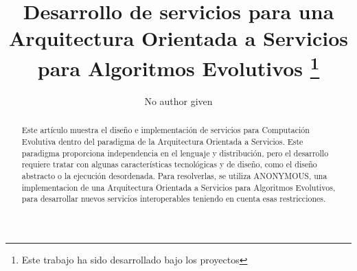 \documentclass[runningheads]{llncs}
\begin{document}
\mainmatter  %



\title{Desarrollo de servicios para una Arquitectura Orientada a Servicios para Algoritmos Evolutivos \thanks{Este trabajo ha sido desarrollado bajo los proyectos 
}}

\author{No author given}

%







\maketitle
\begin{abstract}
Este artículo muestra el diseño e implementación de servicios para
Computación Evolutiva dentro del paradigma de la Arquitectura
Orientada a Servicios. Este paradigma proporciona independencia en el
lenguaje y distribución, pero el desarrollo requiere tratar con
algunas características tecnológicas y de diseño, como el diseño
abstracto o la ejecución desordenada. Para resolverlas, se utiliza
ANONYMOUS, una implementacion de una Arquitectura Orientada a
Servicios para Algoritmos Evolutivos, para desarrollar nuevos
servicios interoperables teniendo en cuenta esas restricciones. %

\end{abstract}
\end{document}
